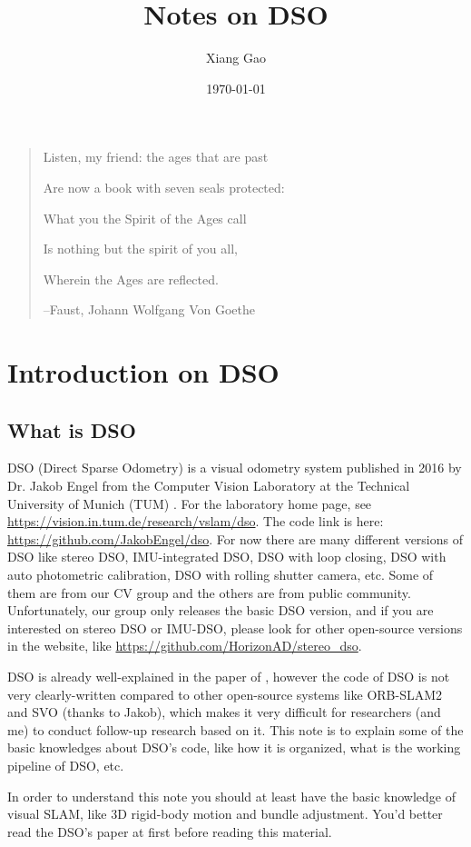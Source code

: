 \documentclass[a4paper,10pt]{article}
\title{Notes on DSO}
\author{Xiang Gao}
\date{\today}
\begin{document}
	\maketitle
	
	\begin{quotation}
		\centering
		Listen, my friend: the ages that are past
		
		Are now a book with seven seals protected:
		
		What you the Spirit of the Ages call
		
		Is nothing but the spirit of you all,
		
		Wherein the Ages are reflected.
		
		--Faust, Johann Wolfgang Von Goethe
	\end{quotation}
	
	\section{Introduction on DSO}
	\subsection{What is DSO}
	DSO (Direct Sparse Odometry) is a visual odometry system published in 2016 by Dr. Jakob Engel from the Computer Vision Laboratory at the Technical University of Munich (TUM) \cite{engel2017direct}. For the laboratory home page, see \url{https://vision.in.tum.de/research/vslam/dso}. The code link is here: \url{https://github.com/JakobEngel/dso}. For now there are many different versions of DSO like stereo DSO, IMU-integrated DSO, DSO with loop closing, DSO with auto photometric calibration, DSO with rolling shutter camera, etc. Some of them are from our CV group and the others are from public community. Unfortunately, our group only releases the basic DSO version, and if you are interested on stereo DSO or IMU-DSO, please look for other open-source versions in the website, like \url{https://github.com/HorizonAD/stereo_dso}. 

	DSO is already well-explained in the paper of \cite{engel2017direct}, however the code of DSO is not very clearly-written compared to other open-source systems like ORB-SLAM2 and SVO (thanks to Jakob), which makes it very difficult for researchers (and me) to conduct follow-up research based on it. This note is to explain some of the basic knowledges about DSO's code, like how it is organized, what is the working pipeline of DSO, etc. 
	
	In order to understand this note you should at least have the basic knowledge of visual SLAM, like 3D rigid-body motion and bundle adjustment. You'd better read the DSO's paper at first before reading this material.
	
\end{document}
